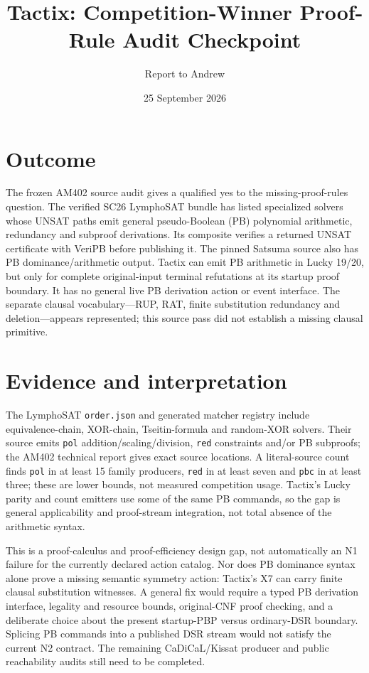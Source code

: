 \documentclass[11pt]{article}
\title{Tactix: Competition-Winner Proof-Rule Audit Checkpoint}
\author{Report to Andrew}
\date{25 September 2026}
\newcommand{\code}[1]{\texttt{#1}}
\begin{document}
\maketitle
\vspace{-1.4em}

\section*{Outcome}
The frozen AM402 source audit gives a qualified yes to the missing-proof-rules question. The verified SC26 LymphoSAT bundle has listed specialized solvers whose UNSAT paths emit general pseudo-Boolean (PB) polynomial arithmetic, redundancy and subproof derivations. Its composite verifies a returned UNSAT certificate with VeriPB before publishing it. The pinned Satsuma source also has PB dominance/arithmetic output. Tactix can emit PB arithmetic in Lucky 19/20, but only for complete original-input terminal refutations at its startup proof boundary. It has no general live PB derivation action or event interface. The separate clausal vocabulary---RUP, RAT, finite substitution redundancy and deletion---appears represented; this source pass did not establish a missing clausal primitive.

\section*{Evidence and interpretation}
The LymphoSAT \code{order.json} and generated matcher registry include equivalence-chain, XOR-chain, Tseitin-formula and random-XOR solvers. Their source emits \code{pol} addition/scaling/division, \code{red} constraints and/or PB subproofs; the AM402 technical report gives exact source locations. A literal-source count finds \code{pol} in at least 15 family producers, \code{red} in at least seven and \code{pbc} in at least three; these are lower bounds, not measured competition usage. Tactix's Lucky parity and count emitters use some of the same PB commands, so the gap is general applicability and proof-stream integration, not total absence of the arithmetic syntax.

This is a proof-calculus and proof-efficiency design gap, not automatically an N1 failure for the currently declared action catalog. Nor does PB dominance syntax alone prove a missing semantic symmetry action: Tactix's X7 can carry finite clausal substitution witnesses. A general fix would require a typed PB derivation interface, legality and resource bounds, original-CNF proof checking, and a deliberate choice about the present startup-PBP versus ordinary-DSR boundary. Splicing PB commands into a published DSR stream would not satisfy the current N2 contract. The remaining CaDiCaL/Kissat producer and public reachability audits still need to be completed.
\end{document}
